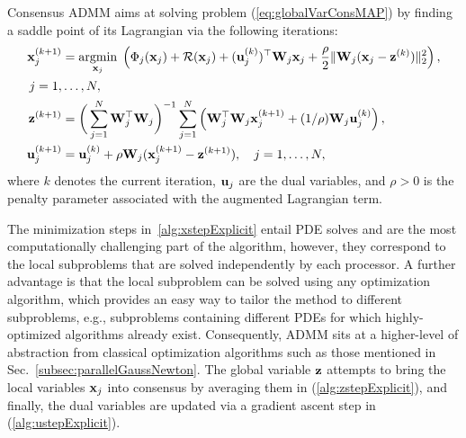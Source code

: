 \documentclass[11pt]{article}          %
\DeclareMathOperator*{\argmin}{argmin}
\newcommand{\bfW}{{\bf W}}
\newcommand{\bfx}{{\bf  x}}
\newcommand{\bfu}{{\bf u}}
\newcommand{\bfz}{{\bf z}}
\begin{document}
Consensus ADMM aims at solving problem (\ref{eq:globalVarConsMAP}) by finding a saddle point of its Lagrangian via the following iterations:
\begin{align}
        \bfx_j^{(k+1)} &= \argmin_{\bfx_j} \; \left( \Phi_j(\bfx_j) + \mathcal{R}(\bfx_j) + (\bfu_j^{(k)})^\top \bfW_j\bfx_j + \frac{\rho}{2}\| \bfW_j(\bfx_j - \bfz^{(k)}) \|_2^2 \right), \label{alg:xstepExplicit} \\ j=1,&\ldots,N, \nonumber
    \\
    \bfz^{(k+1)} &= \bigg(\sum_{j=1}^N \bfW_j^\top \bfW_j\bigg)^{-1} \sum_{j=1}^N \left( \bfW_j^\top \bfW_j\bfx_j^{(k+1)} + (1/\rho) \bfW_j\bfu_j^{(k)} \right), \label{alg:zstepExplicit}
    \\
    \bfu_j^{(k+1)} &= \bfu_j^{(k)} + \rho \bfW_j(\bfx_j^{(k+1)} - \bfz^{(k+1)}), \quad j=1,\ldots,N,\label{alg:ustepExplicit}
\end{align}
where $k$ denotes the current iteration, $\bfu_j$ are the dual variables, and $\rho>0$ is the penalty parameter associated with the augmented Lagrangian term. 

The minimization steps in~\eqref{alg:xstepExplicit} entail PDE solves and are the most computationally challenging part of the algorithm, however, they correspond to the local subproblems that are solved independently by each processor.
A further advantage is that the local subproblem can be solved using any optimization algorithm, which provides an easy way to tailor the method to different subproblems, e.g., subproblems containing different PDEs for which highly-optimized algorithms already exist. 
Consequently, ADMM sits at a higher-level of abstraction from classical optimization algorithms such as those mentioned in Sec.~\ref{subsec:parallelGaussNewton}.
The global variable $\bfz$ attempts to bring the local variables $\bfx_j$ into consensus by averaging them in (\ref{alg:zstepExplicit}), and finally, the dual variables are updated via a gradient ascent step in (\ref{alg:ustepExplicit}). 
\end{document}

